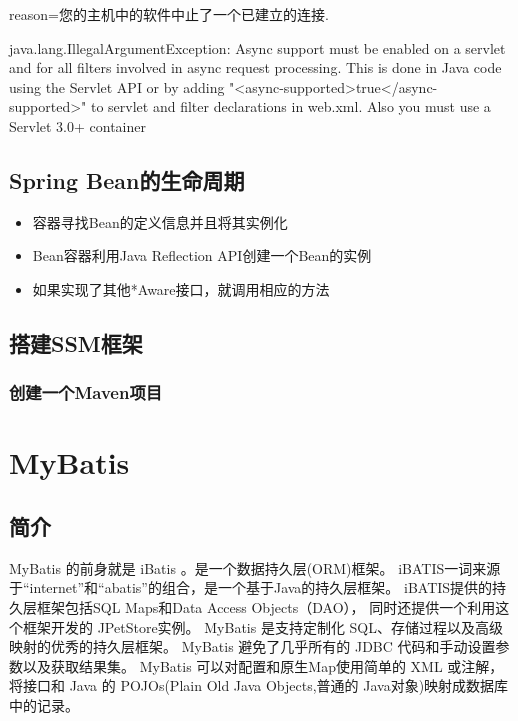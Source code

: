 \documentclass{book}
\begin{document}
reason=您的主机中的软件中止了一个已建立的连接.

java.lang.IllegalArgumentException: Async support must be enabled on a servlet 
and for all filters involved in async request processing. 
This is done in Java code using the Servlet API 
or by adding "<async-supported>true</async-supported>" to 
servlet and filter declarations in web.xml. Also you must use a Servlet 3.0+ container

\subsection{Spring Bean的生命周期}

\begin{itemize}
	\item{容器寻找Bean的定义信息并且将其实例化}
	\item{Bean容器利用Java Reflection API创建一个Bean的实例}
	\item{如果实现了其他*Aware接口，就调用相应的方法}
\end{itemize}

\subsection{搭建SSM框架}

\subsubsection{创建一个Maven项目}



\section{MyBatis}

\subsection{简介}

MyBatis 的前身就是 iBatis 。是一个数据持久层(ORM)框架。
iBATIS一词来源于“internet”和“abatis”的组合，是一个基于Java的持久层框架。
iBATIS提供的持久层框架包括SQL Maps和Data Access Objects（DAO），
同时还提供一个利用这个框架开发的 JPetStore实例。
MyBatis 是支持定制化 SQL、存储过程以及高级映射的优秀的持久层框架。
MyBatis 避免了几乎所有的 JDBC 代码和手动设置参数以及获取结果集。
MyBatis 可以对配置和原生Map使用简单的 XML 或注解，
将接口和 Java 的 POJOs(Plain Old Java Objects,普通的 Java对象)映射成数据库中的记录。
\end{document}
